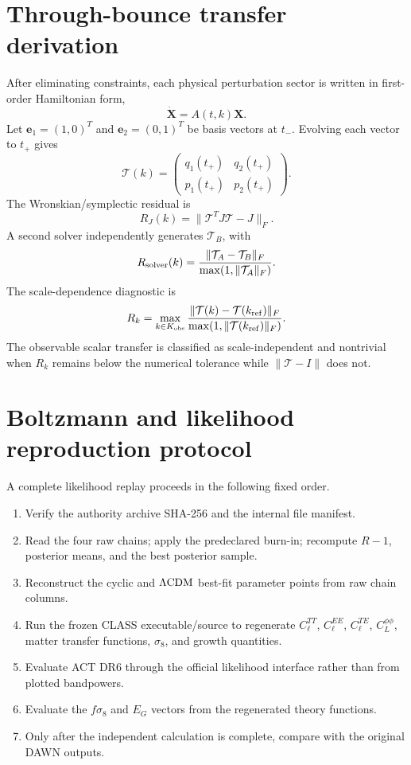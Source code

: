 \documentclass[12pt]{iopart}
\newcommand{\LCDM}{\Lambda{\rm CDM}}
\newcommand{\cT}{\mathcal T}
\begin{document}
\section{Through-bounce transfer derivation}
\label{app:bounce}

After eliminating constraints, each physical perturbation sector is written in first-order Hamiltonian form,
\begin{equation}
\dot{\bm X}=A(t,k)\bm X.
\end{equation}
Let $\bm e_1=(1,0)^T$ and $\bm e_2=(0,1)^T$ be basis vectors at $t_-$.  Evolving each vector to $t_+$ gives
\begin{equation}
\cT(k)=\left(\begin{array}{cc}
q_1(t_+) & q_2(t_+)\\
p_1(t_+) & p_2(t_+)
\end{array}\right).
\end{equation}
The Wronskian/symplectic residual is
\begin{equation}
R_J(k)=\|\cT^TJ\cT-J\|_F.
\end{equation}
A second solver independently generates $\cT_B$, with
\begin{equation}
R_{\rm solver}(k)=\frac{\|\cT_A-\cT_B\|_F}{\max(1,\|\cT_A\|_F)}.
\end{equation}
The scale-dependence diagnostic is
\begin{equation}
R_k=\max_{k\in K_{\rm obs}}\frac{\|\cT(k)-\cT(k_{\rm ref})\|_F}
{\max(1,\|\cT(k_{\rm ref})\|_F)}.
\end{equation}
The observable scalar transfer is classified as scale-independent and nontrivial when $R_k$ remains below the numerical tolerance while $\|\cT-I\|$ does not.

\section{Boltzmann and likelihood reproduction protocol}
\label{app:likelihood}

A complete likelihood replay proceeds in the following fixed order.
\begin{enumerate}
\item Verify the authority archive SHA-256 and the internal file manifest.
\item Read the four raw chains; apply the predeclared burn-in; recompute $R-1$, posterior means, and the best posterior sample.
\item Reconstruct the cyclic and $\LCDM$ best-fit parameter points from raw chain columns.
\item Run the frozen CLASS executable/source to regenerate $C_\ell^{TT}$, $C_\ell^{EE}$, $C_\ell^{TE}$, $C_L^{\phi\phi}$, matter transfer functions, $\sigma_8$, and growth quantities.
\item Evaluate ACT DR6 through the official likelihood interface rather than from plotted bandpowers.
\item Evaluate the $f\sigma_8$ and $E_G$ vectors from the regenerated theory functions.
\item Only after the independent calculation is complete, compare with the original DAWN outputs.
\end{enumerate}
\end{document}
